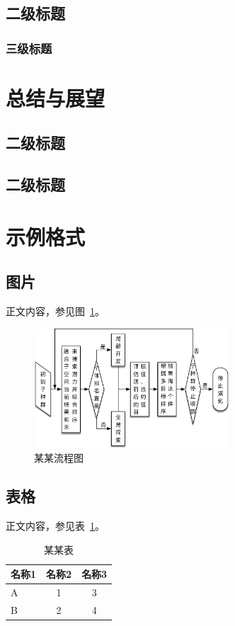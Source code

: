 \documentclass[a4paper,11pt,hyperref]{ctexart}
\begin{document}
\subsection{二级标题}

\subsubsection{三级标题}

\section{总结与展望}

\subsection{二级标题}

\subsection{二级标题}

\newpage

\section*{示例格式}

\subsection*{图片}
正文内容，参见图~\ref{fig1}。
\begin{figure}[h]
\centering
\includegraphics[width=0.65\textwidth]{fig1}
\caption{某某流程图}\label{fig1}
\end{figure}

\subsection*{表格}
正文内容，参见表~\ref{tab1}。
\begin{table}[h]
\centering
\caption{某某表}\label{tab1}
\begin{tabular}{l|cc}
  名称1 & 名称2 & 名称3 \\
  \hline
  A & 1 & 3\\
  B & 2 & 4
\end{tabular}
\end{table}
\end{document}
